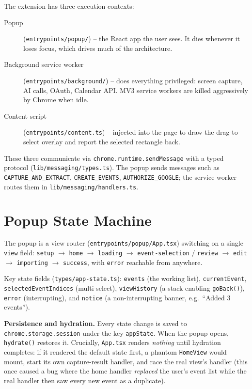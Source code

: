 \documentclass[11pt]{article}
\begin{document}
The extension has three execution contexts:

\begin{description}
  \item[Popup] (\texttt{entrypoints/popup/}) -- the React app the user sees.
        It dies whenever it loses focus, which drives much of the
        architecture.
  \item[Background service worker] (\texttt{entrypoints/background/}) -- does
        everything privileged: screen capture, AI calls, OAuth, Calendar API.
        MV3 service workers are killed aggressively by Chrome when idle.
  \item[Content script] (\texttt{entrypoints/content.ts}) -- injected into the
        page to draw the drag-to-select overlay and report the selected
        rectangle back.
\end{description}

These three communicate via \texttt{chrome.runtime.sendMessage} with a typed
protocol (\texttt{lib/messaging/types.ts}). The popup sends messages such as
\texttt{CAPTURE\_AND\_EXTRACT}, \texttt{CREATE\_EVENTS},
\texttt{AUTHORIZE\_GOOGLE}; the service worker routes them in
\texttt{lib/messaging/handlers.ts}.

\section{Popup State Machine}

The popup is a view router (\texttt{entrypoints/popup/App.tsx}) switching on a
single \texttt{view} field:
\texttt{setup} $\rightarrow$ \texttt{home} $\rightarrow$ \texttt{loading}
$\rightarrow$ \texttt{event-selection} / \texttt{review} $\rightarrow$
\texttt{edit} $\rightarrow$ \texttt{importing} $\rightarrow$ \texttt{success},
with \texttt{error} reachable from anywhere.

Key state fields (\texttt{types/app-state.ts}): \texttt{events} (the working
list), \texttt{currentEvent}, \texttt{selectedEventIndices} (multi-select),
\texttt{viewHistory} (a stack enabling \texttt{goBack()}), \texttt{error}
(interrupting), and \texttt{notice} (a non-interrupting banner, e.g.\ ``Added
3 events'').

\textbf{Persistence and hydration.} Every state change is saved to
\texttt{chrome.storage.session} under the key \texttt{appState}. When the
popup opens, \texttt{hydrate()} restores it. Crucially, \texttt{App.tsx}
renders \emph{nothing} until hydration completes: if it rendered the default
state first, a phantom \texttt{HomeView} would mount, start its own
capture-result handler, and race the real view's handler (this once caused a
bug where the home handler \emph{replaced} the user's event list while the
real handler then saw every new event as a duplicate).
\end{document}
